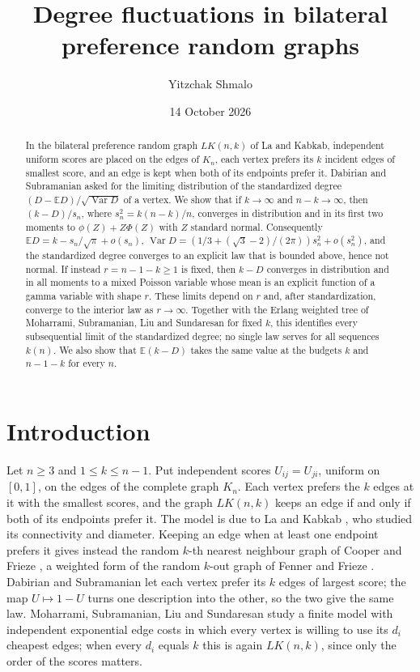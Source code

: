 \documentclass[11pt]{amsart}
\title[Degree fluctuations in bilateral preference graphs]{Degree fluctuations in bilateral preference random graphs}
\author{Yitzchak Shmalo}
\date{14 October 2026}
\theoremstyle{remark}
\numberwithin{equation}{section}
\newcommand{\E}{\mathbb E}
\newcommand{\1}{\mathbf 1}
\newcommand{\Var}{\operatorname{Var}}
\begin{document}
\begin{abstract}
In the bilateral preference random graph $LK(n,k)$ of La and Kabkab, independent uniform scores are placed on the edges of $K_n$, each vertex prefers its $k$ incident edges of smallest score, and an edge is kept when both of its endpoints prefer it. Dabirian and Subramanian asked for the limiting distribution of the standardized degree $(D-\E D)/\sqrt{\Var D}$ of a vertex. We show that if $k\to\infty$ and $n-k\to\infty$, then $(k-D)/s_n$, where $s_n^2=k(n-k)/n$, converges in distribution and in its first two moments to $\phi(Z)+Z\Phi(Z)$ with $Z$ standard normal. Consequently $\E D=k-s_n/\sqrt\pi+o(s_n)$, $\Var D=(1/3+(\sqrt3-2)/(2\pi))s_n^2+o(s_n^2)$, and the standardized degree converges to an explicit law that is bounded above, hence not normal. If instead $r=n-1-k\ge1$ is fixed, then $k-D$ converges in distribution and in all moments to a mixed Poisson variable whose mean is an explicit function of a gamma variable with shape $r$. These limits depend on $r$ and, after standardization, converge to the interior law as $r\to\infty$. Together with the Erlang weighted tree of Moharrami, Subramanian, Liu and Sundaresan for fixed $k$, this identifies every subsequential limit of the standardized degree; no single law serves for all sequences $k(n)$. We also show that $\E(k-D)$ takes the same value at the budgets $k$ and $n-1-k$ for every $n$.
\end{abstract}
\maketitle

\section{Introduction}\label{sec:intro}

Let $n\ge3$ and $1\le k\le n-1$. Put independent scores $U_{ij}=U_{ji}$, uniform on $[0,1]$, on the edges of the complete graph $K_n$. Each vertex prefers the $k$ edges at it with the smallest scores, and the graph $LK(n,k)$ keeps an edge if and only if both of its endpoints prefer it. The model is due to La and Kabkab \cite{LK}, who studied its connectivity and diameter. Keeping an edge when at least one endpoint prefers it gives instead the random $k$-th nearest neighbour graph of Cooper and Frieze \cite{CF95}, a weighted form of the random $k$-out graph of Fenner and Frieze \cite{FF82}. Dabirian and Subramanian \cite{DS} let each vertex prefer its $k$ edges of largest score; the map $U\mapsto1-U$ turns one description into the other, so the two give the same law. Moharrami, Subramanian, Liu and Sundaresan \cite{EWT} study a finite model with independent exponential edge costs in which every vertex is willing to use its $d_i$ cheapest edges; when every $d_i$ equals $k$ this is again $LK(n,k)$, since only the order of the scores matters.
\end{document}
